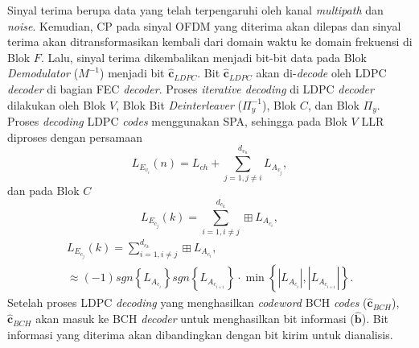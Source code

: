 Sinyal terima berupa data yang telah terpengaruhi oleh kanal \textit{multipath} dan \textit{noise}. Kemudian, CP pada sinyal OFDM yang diterima akan dilepas dan sinyal terima akan ditransformasikan kembali dari domain waktu ke domain frekuensi di Blok $F$. Lalu, sinyal terima dikembalikan menjadi bit-bit data pada Blok \textit{Demodulator} ($M^{-1}$) menjadi bit $\hat{\mathbf{c}}_{LDPC}$. Bit $\hat{\mathbf{c}}_{LDPC}$ akan di-\textit{decode} oleh LDPC \textit{decoder} di bagian FEC \textit{decoder}. Proses \textit{iterative decoding} di LDPC \textit{decoder} dilakukan oleh Blok $V$, Blok Bit \textit{Deinterleaver} ($\Pi^{-1}_{y}$), Blok $C$, dan Blok $\Pi_{y}$. Proses \textit{decoding} LDPC \textit{codes} menggunakan SPA, sehingga pada Blok $V$ LLR diproses dengan persamaan 
\begin{equation}
L_{E_{{v_{i}}}}(n)=L_{ch}+\sum_{j=1,j\neq i}^{d_{v_{n}}} L_{A_{v_{j}}},
\end{equation}
dan pada Blok $C$ 
\begin{equation}
L_{E_{{c_{j}}}}(k)=\sum_{i=1,i\neq j}^{d_{c_{k}}} \boxplus L_{A_{c_{i}}},
\end{equation}
\begin{gather}
L_{E_{c_{j}}}(k)=\sum_{i=1,i\neq j}^{d_{c_{k}}}\boxplus L_{A_{c_{i}}},\\
\approx  (-1) sgn \left \{  L_{A_{c_{i}}} \right \} sgn \left \{ L_{A_{c_{i+1}}} \right \} \cdot \min \left \{ \left | L_{A_{c_{i}}} \right |,\left | 
L_{A_{c_{i+1}}} \right | \right \}.
\end{gather}
Setelah proses LDPC \textit{decoding} yang menghasilkan \textit{codeword} BCH \textit{codes} ($\hat{\mathbf{c}}_{BCH}$), $\hat{\mathbf{c}}_{BCH}$ akan masuk ke BCH \textit{decoder} untuk menghasilkan bit informasi ($\hat{\mathbf{b}}$). Bit informasi yang diterima akan dibandingkan dengan bit kirim untuk dianalisis.

